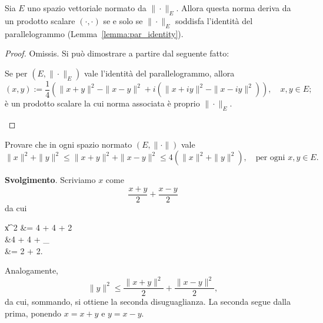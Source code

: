 \begin{theorem}
	Sia $E$ uno spazio vettoriale normato da $\|\cdot\|_E$.
	Allora questa norma deriva da un prodotto scalare $(\cdot,\cdot)$ se e solo se $\|\cdot\|_E$ soddisfa l'identità del parallelogrammo (Lemma~\ref{lemma:par_identity}).
\end{theorem}
\begin{proof}
	Omissis. Si può dimostrare a partire dal seguente fatto:

	\begin{lemma}[Polarizzazione]
		Se per $(E, \|\cdot\|_E)$ vale l'identità del parallelogrammo, allora
		\begin{equation*}
			(x,y) := \frac14 (\|x+y\|^2 - \|x-y\|^2 + i(\|x+iy\|^2 - \|x - iy\|^2)), \quad x,y \in E;
		\end{equation*}
		è un prodotto scalare la cui norma associata è proprio $\|\cdot\|_E$.
	\end{lemma}
\end{proof}

\begin{exercise}
	Provare che in ogni spazio normato $(E, \|\cdot\|)$ vale
	\begin{equation*}
		\|x\|^2+\|y\|^2 \leq \|x+y\|^2 + \|x-y\|^2 \leq 4(\|x\|^2 + \|y\|^2), \quad \text{per ogni $x,y \in E$}.
	\end{equation*}

	\textbf{Svolgimento}.
	Scriviamo $x$ come
	\begin{equation*}
		\frac{x+y}2 + \frac{x-y}2
	\end{equation*}
	da cui
	\begin{eqalign*}
		\|x\|^2 &= 4 + 4 + 2\\
		&\leq {}4 + 4 + _{}\\
		&= 2 + 2.
	\end{eqalign*}
	Analogamente,
	\begin{equation*}
		\|y\|^2 \leq \frac{\|x+y\|^2}2 + \frac{\|x-y\|^2}2,
	\end{equation*}
	da cui, sommando, si ottiene la seconda disuguaglianza. La seconda segue dalla prima, ponendo $x=x+y$ e $y=x-y$.
\end{exercise}

